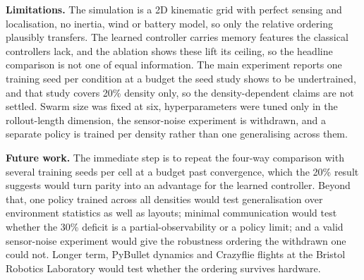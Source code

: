 \documentclass[a4paper, 10pt, conference]{ieeeconf}
\begin{document}
\textbf{Limitations.} The simulation is a 2D kinematic grid with
perfect sensing and localisation, no inertia, wind or battery model,
so only the relative ordering plausibly transfers. The learned
controller carries memory features the classical controllers lack, and
the ablation shows these lift its ceiling, so the headline comparison
is not one of equal information. The main experiment reports one
training seed per condition at a budget the seed study shows to be
undertrained, and that study covers 20\% density only, so the
density-dependent claims are not settled. Swarm size was fixed at six,
hyperparameters were tuned only in the rollout-length dimension, the
sensor-noise experiment is withdrawn, and a separate policy is trained
per density rather than one generalising across them.

\textbf{Future work.} The immediate step is to repeat the four-way
comparison with several training seeds per cell at a budget past
convergence, which the 20\% result suggests would turn parity into an
advantage for the learned controller. Beyond that, one policy trained
across all densities would test generalisation over environment statistics as
well as layouts; minimal communication would test whether the 30\%
deficit is a partial-observability or a policy limit; and a valid
sensor-noise experiment would give the robustness ordering the
withdrawn one could not. Longer term, PyBullet dynamics and Crazyflie
flights at the Bristol Robotics Laboratory would test whether the
ordering survives hardware.

{\footnotesize\linespread{0.90}\selectfont


}
\end{document}
